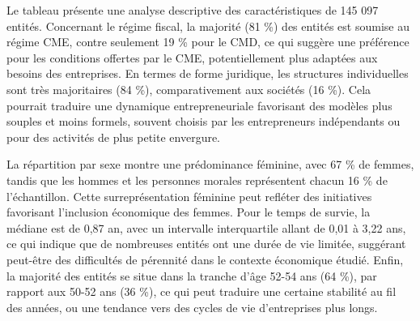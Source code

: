 \documentclass[a4paper,12pt]{report}
\begin{document}


\noindent
Le tableau présente une analyse descriptive des caractéristiques de 145 097 entités. Concernant le régime fiscal, la majorité (81 \%) des entités est soumise au régime CME, contre seulement 19 \% pour le CMD, ce qui suggère une préférence pour les conditions offertes par le CME, potentiellement plus adaptées aux besoins des entreprises. En termes de forme juridique, les structures individuelles sont très majoritaires (84 \%), comparativement aux sociétés (16 \%). Cela pourrait traduire une dynamique entrepreneuriale favorisant des modèles plus souples et moins formels, souvent choisis par les entrepreneurs indépendants ou pour des activités de plus petite envergure.

La répartition par sexe montre une prédominance féminine, avec 67 \% de femmes, tandis que les hommes et les personnes morales représentent chacun 16 \% de l’échantillon. Cette surreprésentation féminine peut refléter des initiatives favorisant l’inclusion économique des femmes. Pour le temps de survie, la médiane est de 0,87 an, avec un intervalle interquartile allant de 0,01 à 3,22 ans, ce qui indique que de nombreuses entités ont une durée de vie limitée, suggérant peut-être des difficultés de pérennité dans le contexte économique étudié. Enfin, la majorité des entités se situe dans la tranche d’âge 52-54 ans (64 \%), par rapport aux 50-52 ans (36 \%), ce qui peut traduire une certaine stabilité au fil des années, ou une tendance vers des cycles de vie d’entreprises plus longs.

\newpage


\end{document}

